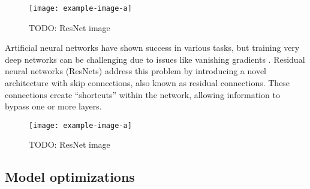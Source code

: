 \begin{figure}[hbtp]
\centering    
\texttt{[image: example-image-a]}
\caption{TODO: ResNet image}
\end{figure}

Artificial neural networks have shown success in various tasks, but training very deep networks can be challenging due to issues like vanishing gradients \cite{}.
Residual neural networks (ResNets) address this problem by introducing a novel architecture with skip connections, also known as residual connections.
These connections create ``shortcuts'' within the network, allowing information to bypass one or more layers.


\begin{figure}[hbtp]
\centering    
\texttt{[image: example-image-a]}
\caption{TODO: ResNet image}
\end{figure}

\subsection{Model optimizations}
